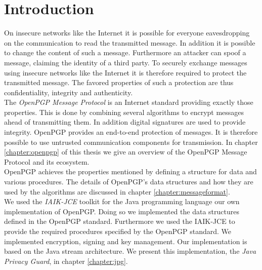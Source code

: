 \chapter{Introduction}



On insecure networks like the Internet it is possible for everyone eavesdropping on the communication to read the transmitted message. In addition it is possible to change the content of such a message. Furthermore an attacker can spoof a message, claiming the identity of a third party.
To securely exchange messages using insecure networks like the Internet it is therefore required to protect the transmitted message. The favored properties of such a protection are thus confidentiality, integrity and authenticity. \\


The \textit{OpenPGP Message Protocol} is an Internet standard providing exactly those properties.  This is done by combining several algorithms to encrypt messages ahead of transmitting them. In addition digital signatures are used to provide integrity. OpenPGP provides an end-to-end protection of messages. It is therefore possible to use untrusted communication components for transmission.
In chapter \ref{chapter:openpgp} of this thesis we give an overview of the OpenPGP Message Protocol and its ecosystem. \\

OpenPGP achieves the properties mentioned by defining a structure for data and various procedures. The details of OpenPGP's data structures and how they are used by the algorithms are discussed in chapter \ref{chapter:messageformat}. \\


We used the \textit{IAIK-JCE} toolkit for the Java programming language  our own implementation of OpenPGP. Doing so we implemented the data structures defined in the OpenPGP standard. Furthermore we used the IAIK-JCE to provide the required procedures specified by the OpenPGP standard. We implemented encryption, signing and key management. Our implementation is based on the Java stream architecture. We present this implementation, the \textit{Java Privacy Guard}, in chapter \ref{chapter:jpg}. \\

